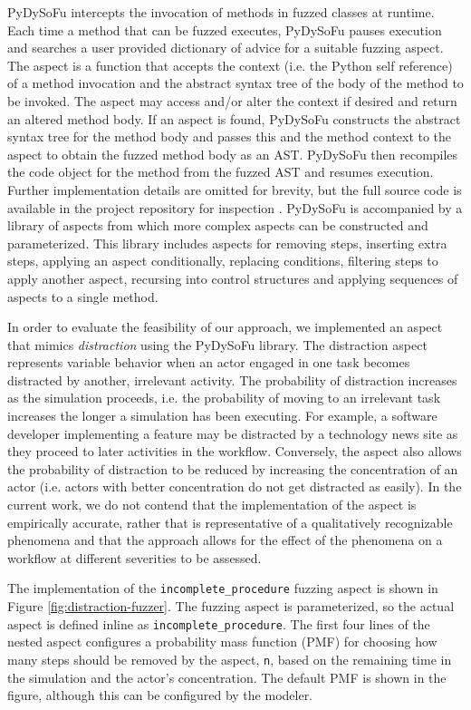 \documentclass{llncs}
\begin{document}
PyDySoFu intercepts the invocation of methods in fuzzed classes at runtime.  Each time a method that can be fuzzed
executes, PyDySoFu pauses execution and searches a user provided dictionary of advice for a suitable fuzzing aspect. The
aspect is a function that accepts the context (i.e. the Python self reference) of a method invocation and the abstract
syntax tree of the body of the method to be invoked.  The aspect may access and/or alter the context if desired and
return an altered method body.  If an aspect is found, PyDySoFu constructs the abstract syntax tree for the method body
and passes this and the method context to the aspect to obtain the fuzzed method body as an AST.  PyDySoFu then
recompiles the code object for the method from the fuzzed AST and resumes execution.  Further implementation details are
omitted for brevity, but the full source code is available in the project repository for inspection
\cite{storer2016pydysofu-scm}. PyDySoFu is accompanied by a library of aspects from which more complex aspects can be
constructed and parameterized.  This library includes aspects for removing steps, inserting extra steps, applying an
aspect conditionally, replacing conditions, filtering steps to apply another aspect, recursing into control structures
and applying sequences of aspects to a single method.

In order to evaluate the feasibility of our approach, we implemented an aspect that mimics \emph{distraction}  using
the PyDySoFu library.  The distraction aspect represents variable behavior when an actor engaged in one task becomes
distracted by another, irrelevant activity.  The probability of distraction increases as the simulation proceeds,
i.e. the probability of moving to an irrelevant task increases the longer a simulation has been executing.  For example,
a software developer implementing a feature may be distracted by a technology news site as they proceed to later
activities in the workflow.  Conversely, the aspect also allows the probability of distraction to be reduced by
increasing the concentration of an actor (i.e. actors with better concentration do not get distracted as easily).  In
the current work, we do not contend that the implementation of the aspect is empirically accurate, rather that is
representative of a qualitatively recognizable phenomena and that the approach allows for the effect of the phenomena on
a workflow at different severities to be assessed.

The implementation of the \lstinline!incomplete_procedure! fuzzing aspect is shown in Figure
\ref{fig:distraction-fuzzer}.  The fuzzing aspect is parameterized, so the actual aspect is defined inline as
\lstinline!incomplete_procedure!.  The first four lines of the nested aspect configures a probability mass function
(PMF) for choosing how many steps should be removed by the aspect, \lstinline!n!, based on the remaining time in the
simulation and the actor's concentration. The default PMF is shown in the figure, although this can be configured by the
modeler.
\end{document}
